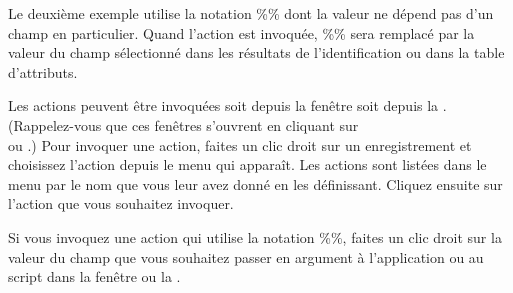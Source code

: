 Le deuxième exemple utilise la notation \%\% dont la valeur ne dépend pas d'un champ en particulier. Quand l'action est invoquée, \%\% sera remplacé par la valeur du champ sélectionné dans les résultats de l'identification ou dans la table d'attributs.

\label{label_usingactions}
Les actions peuvent être invoquées soit depuis la fenêtre  soit depuis la . (Rappelez-vous que ces fenêtres s'ouvrent en cliquant sur\\  ou .)
Pour invoquer une action, faites un clic droit sur un enregistrement et choisissez l'action depuis le menu qui apparaît. Les actions sont listées dans le menu par le nom que vous leur avez donné en les définissant. Cliquez ensuite sur l'action que vous souhaitez invoquer.

Si vous invoquez une action qui utilise la notation \%\%, faites un clic droit sur la valeur du champ que vous souhaitez passer en argument à l'application ou au script dans la fenêtre  ou la .

